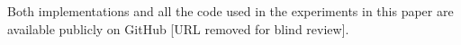 \documentclass[preprint, 10pt, numbers]{sigplanconf}
\begin{document}
Both implementations and all the code used in the experiments in this paper are available publicly on GitHub [URL removed for blind review].








\end{document}
